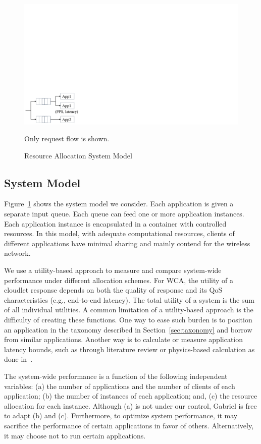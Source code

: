 \begin{figure}
\centering
\includegraphics[width=0.5\linewidth]{FIGS/fig-allocation-system-model-cropped.pdf}
\begin{captiontext}Only request flow is shown.\end{captiontext}
\caption{\small Resource Allocation System Model}
\label{fig:allocation-system-model}
\vspace{-0.2in}
\end{figure}

\subsection{System Model}
Figure~\ref{fig:allocation-system-model} shows the system model we
consider. Each application is given a separate input queue. Each queue
can feed one or more application instances. Each application instance
is encapsulated in a container with controlled resources. In this
model, with adequate computational resources, clients of different
applications have minimal sharing and mainly contend for the wireless
network.

We use a utility-based approach to measure and compare system-wide
performance under different allocation schemes. For WCA, the utility
of a cloudlet response depends on both the quality of response and its
QoS characteristics (e.g., end-to-end latency). The total utility of a
system is the sum of all individual utilities. A common limitation of
a utility-based approach is the difficulty of creating these
functions. One way to ease such burden is to position an application
in the taxonomy described in Section~\ref{sec:taxonomy} and borrow
from similar applications. Another way is to calculate or measure
application latency bounds, such as through literature review or
physics-based calculation as done in~\cite{chen2017empirical}.

The system-wide performance is a function of the following independent
variables: (a) the number of applications and the number of clients of
each application; (b) the number of instances of each application;
and, (c) the resource allocation for each instance.  Although (a) is
not under our control, Gabriel is free to adapt (b) and (c).
Furthermore, to optimize system performance, it may sacrifice the
performance of certain applications in favor of others.
Alternatively, it may choose not to run certain applications.


